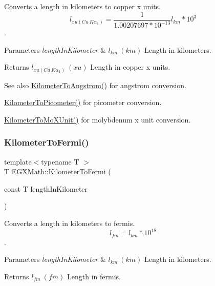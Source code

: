 Converts a length in kilometers to copper x units. \[ l_{xu(Cu\ K\alpha_1)}= \frac{1}{1.00207697*10^{-13}} l_{km} * 10^{3}\]. 


\begin{DoxyParams}{Parameters}
{\em length\+In\+Kilometer} & $ l_{km}\ (km)$ Length in kilometers. \\
\hline
\end{DoxyParams}
\begin{DoxyReturn}{Returns}
$ l_{xu(Cu\ K\alpha_1)}\ (xu)$ Length in copper x units. 
\end{DoxyReturn}
\begin{DoxySeeAlso}{See also}
\mbox{\hyperlink{group___e_g_x_math-_conversions-_length_conversions-_s_i-_kilometer-_non-_s_i_ga415a412a1b03916d6071a206a3318035}{Kilometer\+To\+Angstrom()}} for angstrom conversion. 

\mbox{\hyperlink{group___e_g_x_math-_conversions-_length_conversions-_s_i-_kilometer-_s_i_ga73f6e033de3c41892f06cde1862f68d6}{Kilometer\+To\+Picometer()}} for picometer conversion. 

\mbox{\hyperlink{group___e_g_x_math-_conversions-_length_conversions-_s_i-_kilometer-_non-_s_i_ga547782594ebd0cc3e565f6d32f9528df}{Kilometer\+To\+Mo\+X\+Unit()}} for molybdenum x unit conversion. 
\end{DoxySeeAlso}
\mbox{\label{group___e_g_x_math-_conversions-_length_conversions-_s_i-_kilometer-_non-_s_i_ga9c38d019deb86a60173d5d2b65a1ef57}} 
\subsubsection{\texorpdfstring{Kilometer\+To\+Fermi()}{KilometerToFermi()}}
{\footnotesize\ttfamily template$<$typename T $>$ \\
T E\+G\+X\+Math\+::\+Kilometer\+To\+Fermi (\begin{DoxyParamCaption}\item[{const T}]{length\+In\+Kilometer }\end{DoxyParamCaption})}



Converts a length in kilometers to fermis. \[ l_{fm}=l_{km} * 10^{18} \]. 


\begin{DoxyParams}{Parameters}
{\em length\+In\+Kilometer} & $ l_{km}\ (km)$ Length in kilometers. \\
\hline
\end{DoxyParams}
\begin{DoxyReturn}{Returns}
$ l_{fm}\ (fm)$ Length in fermis. 
\end{DoxyReturn}
\mbox{\label{group___e_g_x_math-_conversions-_length_conversions-_s_i-_kilometer-_non-_s_i_gae662bafe0d1fc36276a336fd969307a0}} 
